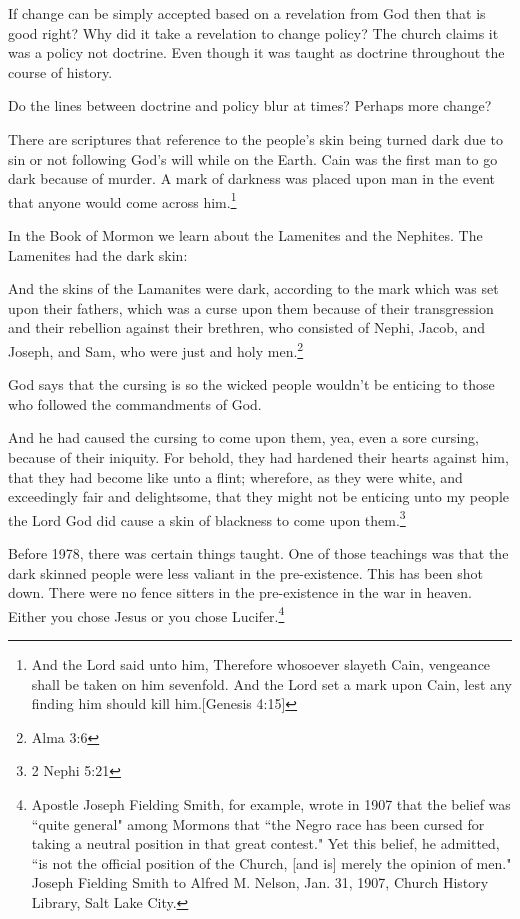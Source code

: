 \documentclass{article}
\begin{document}
If change can be simply accepted based on a revelation from God then that is 
good right? Why did it take a revelation to change policy? The church claims it 
was a policy not doctrine. Even though it was taught as doctrine throughout the 
course of history.

Do the lines between doctrine and policy blur at times? Perhaps more change?

There are scriptures that reference to the people's skin being turned dark due 
to sin or not following God's will while on the Earth. Cain was the first man to 
go dark because of murder. A mark of darkness was placed upon man in the event 
that anyone would come across him.\footnote{And the Lord said unto him, 
Therefore whosoever slayeth Cain, vengeance shall be taken on him sevenfold. 
And the Lord set a mark upon Cain, lest any finding him should kill 
him.[Genesis 4:15]}

In the Book of Mormon we learn about the Lamenites and the Nephites. The 
Lamenites had the dark skin:

\begin{displayquote}
And the skins of the Lamanites were dark, according to the mark which was set 
upon their fathers, which was a curse upon them because of their transgression 
and their rebellion against their brethren, who consisted of Nephi, Jacob, and 
Joseph, and Sam, who were just and holy men.\footnote{Alma 3:6}
\end{displayquote}

God says that the cursing is so the wicked people wouldn't be enticing to those
who followed the commandments of God.

\begin{displayquote}
And he had caused the cursing to come upon them, yea, even a sore cursing, 
because of their iniquity. For behold, they had hardened their hearts against 
him, that they had become like unto a flint; wherefore, as they were white, 
and exceedingly fair and delightsome, that they might not be enticing unto my 
people the Lord God did cause a skin of blackness to come upon 
them.\footnote{2 Nephi 5:21}
\end{displayquote}

Before 1978, there was certain things taught. One of those teachings was that 
the dark skinned people were less valiant in the pre-existence. This has been
shot down. There were no fence sitters in the pre-existence in the war in 
heaven. Either you chose Jesus or you chose Lucifer.\footnote{Apostle Joseph 
Fielding Smith, for example, wrote in 1907 that the belief was ``quite general" 
among Mormons that ``the Negro race has been cursed for taking a neutral 
position in that great contest." Yet this belief, he admitted, ``is not the 
official position of the Church, [and is] merely the opinion of men." 
Joseph Fielding Smith to Alfred M. Nelson, Jan. 31, 1907, 
Church History Library, Salt Lake City.}
\end{document}
